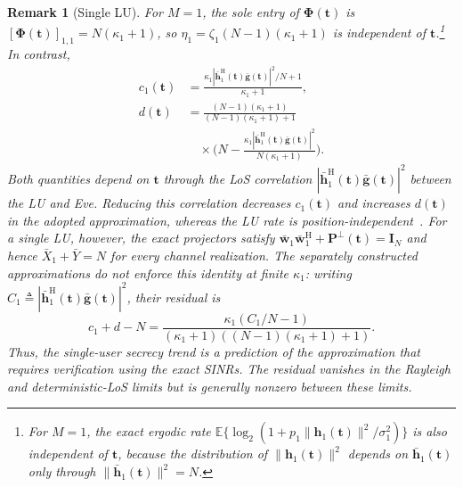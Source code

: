 \documentclass[journal]{IEEEtran}
\newtheorem{remark}{Remark}
\newcommand{\E}{\mathbb{E}}
\newcommand{\bt}{\mathbf{t}}
\newcommand{\bh}{\mathbf{h}}
\newcommand{\hb}{\bar{\mathbf{h}}}
\newcommand{\gb}{\bar{\mathbf{g}}}
\newcommand{\bI}{\mathbf{I}}
\newcommand{\wb}{\bar{\mathbf{w}}}
\newcommand{\bPhi}{\boldsymbol{\Phi}}
\newcommand{\PHp}{\mathbf{P}^{\perp}(\bt)}
\begin{document}
\begin{remark}[Single LU]\label{rem:single}
For $M=1$, the sole entry of $\bPhi(\bt)$ is $[\bPhi(\bt)]_{1,1}=N(\kappa_1+1)$, so $\eta_1=\zeta_1(N-1)(\kappa_1+1)$ is independent of $\bt$.\footnote{For $M=1$, the exact ergodic rate $\E\{\log_2(1+p_1\|\bh_1(\bt)\|^2/\sigma_1^2)\}$ is also independent of $\bt$, because the distribution of $\|\bh_1(\bt)\|^2$ depends on $\hb_1(\bt)$ only through $\|\hb_1(\bt)\|^2=N$.} In contrast,
\begin{align}
c_1(\bt)&=\frac{\kappa_1|\hb_1^{\mathrm{H}}(\bt)\gb(\bt)|^2/N+1}
 {\kappa_1+1},\label{eq:c1}\\
d(\bt)&=\frac{(N-1)(\kappa_1+1)}
 {(N-1)(\kappa_1+1)+1}\nonumber\\
&\quad\times\bigg(N-
 \frac{\kappa_1|\hb_1^{\mathrm{H}}(\bt)\gb(\bt)|^2}
 {N(\kappa_1+1)}\bigg).\label{eq:d1}
\end{align}
Both quantities depend on $\bt$ through the LoS correlation $|\hb_1^{\mathrm{H}}(\bt)\gb(\bt)|^2$ between the LU and Eve. Reducing this correlation decreases $c_1(\bt)$ and increases $d(\bt)$ in the adopted approximation, whereas the LU rate is position-independent~\cite[Remark~2]{ZhengTCOM2025}. For a single LU, however, the exact projectors satisfy $\wb_1\wb_1^{\mathrm{H}}+\PHp=\bI_N$ and hence $\bar X_1+\bar Y=N$ for every channel realization. The separately constructed approximations do not enforce this identity at finite $\kappa_1$: writing $C_1\triangleq|\hb_1^{\mathrm{H}}(\bt)\gb(\bt)|^2$, their residual is
\begin{equation}\label{eq:single_identity_residual}
c_1+d-N=
\frac{\kappa_1(C_1/N-1)}
{(\kappa_1+1)((N-1)(\kappa_1+1)+1)}.
\end{equation}
Thus, the single-user secrecy trend is a prediction of the approximation that requires verification using the exact SINRs. The residual vanishes in the Rayleigh and deterministic-LoS limits but is generally nonzero between these limits.
\end{remark}
\end{document}
